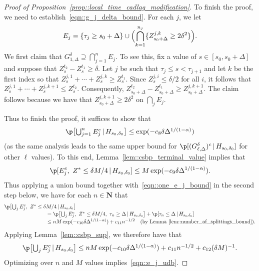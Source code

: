 \documentclass[10pt]{amsart}
\theoremstyle{plain}
\numberwithin{theorem}{section}
\theoremstyle{definition}
\newcommand{\N}{\mathbf{N}}
\newcommand{\giv}{\,|\,}
\begin{document}
\begin{proof}[Proof of Proposition~\ref{prop::local_time_cadlag_modification}]
To finish the proof, we need to establish~\eqref{eqn::g_j_delta_bound}. For each $j$, we let\vspace*{-3pt}
\[
E_j = \{\tau_j \geq s_0 + \Delta \} \cup \Bigl( \bigcap_{k=1}^{n_j} \{ Z_{s_0+\Delta}^{j,k} \geq 2\delta^2\} \Bigr).
\]
We first claim that $G_{1,\Delta}^\delta \supseteq \bigcap_{j=1}^n E_j$. To see this, fix a value of $s \in [s_0,s_0 + \Delta]$ and suppose that $Z_s^{t_2} - Z_s^{t_1} \geq \delta$. Let $j$ be such that $\tau_j \leq s < \tau_{j+1}$ and let $k$ be the first index so that $Z_s^{j,1} + \cdots + Z_s^{j,k} \geq Z_s^{t_1}$. Since $Z_s^{j,i} \leq \delta/2$ for all $i$, it follows that $Z_s^{j,1} + \cdots + Z_s^{j,k+1} \leq Z_s^{t_2}$. Consequently, $Z_{s_0+\Delta}^{t_2} - Z_{s_0+\Delta}^{t_1} \geq Z_{s_0+\Delta}^{j,k+1}$. The claim follows because we have that $Z_{s_0+\Delta}^{j,k+1} \geq 2\delta^2$ on $\bigcap_j E_j$.

Thus to finish the proof, it suffices to show that\vspace*{-3pt}
\begin{equation}
\label{eqn::e_j_udb}
\p\bigl[ \textstyle\bigcup_{j=1}^n E_j^c \giv H_{s_0,\delta_0}\bigr] \leq \exp(-c_8 \delta \Delta^{1/(1-\alpha)})
\end{equation}
(as the same analysis leads to the same upper bound for $\p[(G_{\ell,\Delta}^\delta)^c \giv H_{s_0,\delta_0}]$ for other $\ell$ values). To this end,
Lemma~\ref{lem::csbp_terminal_value} implies that
\begin{equation}
\label{eqn::one_e_j_bound}
\p[ E_j^c,\ Z^* \leq \delta M/4 \giv H_{s_0,\delta_0}] \leq M \exp(-c_9 \delta \Delta^{1/(1-\alpha)}).
\end{equation}
Thus applying a union bound together with~\eqref{eqn::one_e_j_bound} in the second step below, we have for each $n \in \N$ that
\begin{align}
\p\bigl[\textstyle\bigcup_j E_j^c,\ Z^* \leq \delta &M/4 \giv H_{s_0,\delta_0}\bigr] \notag\\[-3pt]
&= \p\bigl[\textstyle\bigcup_j E_j^c,\ Z^* \leq \delta M/4,\ \tau_n \geq \Delta \giv H_{s_0,\delta_0}\bigr] + \p[ \tau_n \leq \Delta \giv H_{s_0,\delta_0}] \notag\\[-3pt]
&\leq n M \exp(- c_{10} \delta \Delta^{1/(1-\alpha)}) + c_{11} n^{-1/2} \quad\text{(by Lemma~\ref{lem::number_of_splittings_bound})}.\label{eqn::e_j_one_step_bound}
\end{align}
Applying Lemma~\ref{lem::csbp_sup}, we therefore have that
\begin{equation}
\label{eqn::e_j_c_bound}
\p\bigl[\textstyle\bigcup_j E_j^c \giv H_{s_0,\delta_0}\bigr] \leq n M \exp(- c_{10} \delta \Delta^{1/(1-\alpha)}) + c_{11} n^{-1/2} + c_{12} (\delta M)^{-1}.
\end{equation}
Optimizing over $n$ and $M$ values implies~\eqref{eqn::e_j_udb}.
\end{proof}
\end{document}
